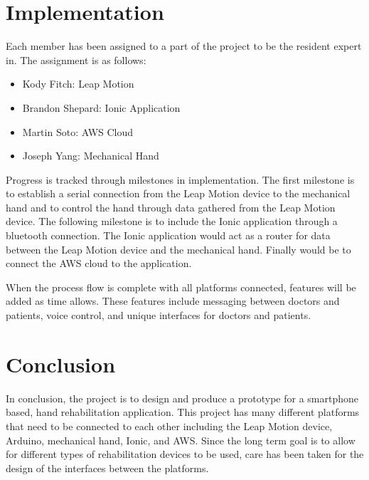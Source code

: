 \documentclass[a4paper,10pt]{article}
\begin{document}
\section{Implementation}

            Each member has been assigned to a part of the project to be the resident expert in. The assignment is as follows:
        \begin{itemize}
         \item Kody Fitch: Leap Motion
         \item Brandon Shepard: Ionic Application
         \item Martin Soto: AWS Cloud
         \item Joseph Yang: Mechanical Hand
        \end{itemize}

            Progress is tracked through milestones in implementation. The first milestone is to establish a serial connection from the Leap Motion device to the mechanical hand and to control the hand through data gathered from the Leap Motion device. The following milestone is to include the Ionic application through a bluetooth connection. The Ionic application would act as a router for data between the Leap Motion device and the mechanical hand. Finally would be to connect the AWS cloud to the application.

            When the process flow is complete with all platforms connected, features will be added as time allows. These features include messaging between doctors and patients, voice control, and unique interfaces for doctors and patients.

\section{Conclusion}

          In conclusion, the project is to design and produce a prototype for a smartphone based, hand rehabilitation application. This project has many different platforms that need to be connected to each other including the Leap Motion device, Arduino, mechanical hand, Ionic, and AWS. Since the long term goal is to allow for different types of rehabilitation devices to be used, care has been taken for the design of the interfaces between the platforms.
\end{document}
